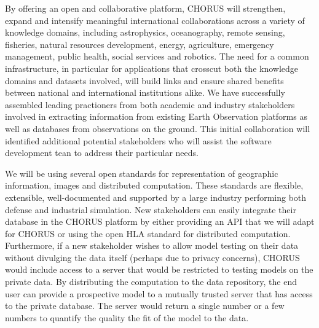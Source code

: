 By offering an open and collaborative platform, CHORUS will
strengthen, expand and intensify meaningful international
collaborations across a variety of knowledge domains, including
astrophysics, oceanography, remote sensing, fisheries, natural
resources development, energy, agriculture, emergency management,
public health, social services and robotics.  The need for a common
infrastructure, in particular for applications that crosscut both the
knowledge domains and datasets involved, will build links and ensure
shared benefits between national and international institutions alike.
We have successfully assembled leading practioners from both academic
and industry stakeholders involved in extracting information from
existing Earth Observation platforms as well as databases from
observations on the ground.  This initial collaboration will identified
additional potential stakeholders who will assist the software development
tean to address their particular needs.

We will be using several open standards for representation of
geographic information, images and distributed computation.  These
standards are flexible, extensible, well-documented and supported by a
large industry performing both defense and industrial simulation.  New
stakeholders can easily integrate their database in the CHORUS
platform by either providing an API that we will adapt for CHORUS or
using the open HLA standard for distributed computation.  Furthermore,
if a new stakeholder wishes to allow model testing on their data
without divulging the data itself (perhaps due to privacy concerns),
CHORUS would include access to a server that would be restricted to
testing models on the private data.  By distributing the computation
to the data repository, the end user can provide a prospective model
to a mutually trusted server that has access to the private database.
The server would return a single number or a few numbers to quantify
the quality the fit of the model to the data.


